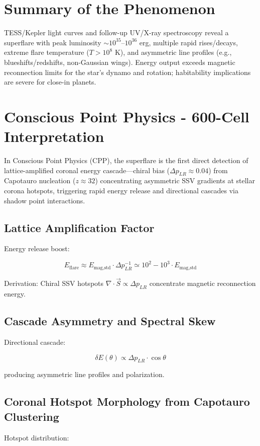 \documentclass[11pt]{article}
\begin{document}
\section{Summary of the Phenomenon}
TESS/Kepler light curves and follow-up UV/X-ray spectroscopy reveal a superflare with peak luminosity $\sim 10^{35}$--$10^{36}$ erg, multiple rapid rises/decays, extreme flare temperature ($T > 10^8$ K), and asymmetric line profiles (e.g., blueshifts/redshifts, non-Gaussian wings). Energy output exceeds magnetic reconnection limits for the star's dynamo and rotation; habitability implications are severe for close-in planets.

\section{Conscious Point Physics - 600-Cell Interpretation}
In Conscious Point Physics (CPP), the superflare is the first direct detection of lattice-amplified coronal energy cascade—chiral bias ($\Delta p_{LR} \approx 0.04$) from Capotauro nucleation ($z \approx 32$) concentrating asymmetric SSV gradients at stellar corona hotspots, triggering rapid energy release and directional cascades via shadow point interactions.

\subsection{Lattice Amplification Factor}
Energy release boost:

\[
E_{\text{flare}} \approx E_{\text{mag,std}} \cdot \Delta p_{LR}^{-1} \simeq 10^{2} - 10^{3} \cdot E_{\text{mag,std}}
\]

Derivation: Chiral SSV hotspots $\nabla \cdot \vec{S} \propto \Delta p_{LR}$ concentrate magnetic reconnection energy.

\subsection{Cascade Asymmetry and Spectral Skew}
Directional cascade:

\[
\delta E(\theta) \propto \Delta p_{LR} \cdot \cos\theta
\]

producing asymmetric line profiles and polarization.

\subsection{Coronal Hotspot Morphology from Capotauro Clustering}
Hotspot distribution:
\end{document}
